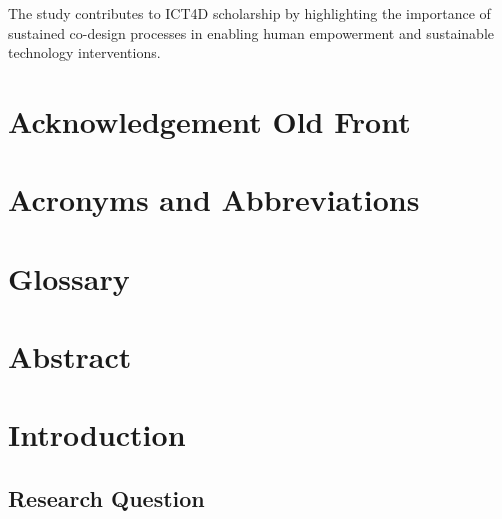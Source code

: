 \documentclass[12pt,a4paper,oneside]{report}
\begin{document}
The study contributes to ICT4D scholarship by highlighting the importance of sustained co-design processes in enabling human empowerment and sustainable technology interventions.


\listoffigures
\listoftables
\tableofcontents
\newpage








\chapter*{Acknowledgement Old Front}

\chapter*{Acronyms and Abbreviations}

\chapter*{Glossary}

\chapter*{Abstract}

\listoffigures
\listoftables
\tableofcontents
\newpage


\chapter{Introduction}

\section{Research Question}

\end{document}
